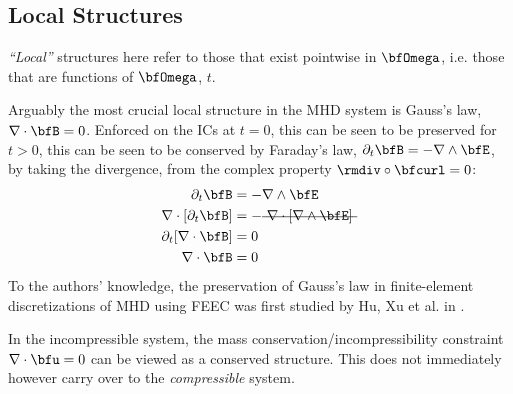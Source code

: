 \subsection*{Local Structures}
    \emph{``Local''} structures here refer to those that exist pointwise in $\bfOmega$, i.e. those that are functions of $\bfOmega$, $t$.
    
    Arguably the most crucial local structure in the MHD system is Gauss's law, $\nabla\cdot\bfB  =  0$. Enforced on the ICs at $t  =  0$, this can be seen to be preserved for $t  >  0$, this can be seen to be conserved by Faraday's law, $\partial_{t}\bfB  =  - \nabla\wedge\bfE$, by taking the divergence, from the complex property $\rmdiv\circ\bfcurl  =  0$: \cite{Stratton_1941, Rosen_1980, Freistühler_Warnecke_2002}
    \begin{align}
                    \partial_{t}\bfB   &=  - \nabla\wedge\bfE  \\
        \nabla\cdot[\partial_{t}\bfB]  &=  - \mst{\nabla\cdot[\nabla\wedge\bfE]}  \\
        \partial_{t}[\nabla\cdot\bfB]  &=  0  \\
                     \nabla\cdot\bfB   &=  0
    \end{align}
    To the authors' knowledge, the preservation of Gauss's law in finite-element discretizations of MHD using FEEC was first studied by Hu, Xu et al. in \cite{Hu_Xu_2015, Hu_Ma_Xu_2017}.

    \begin{remark}
        In the incompressible system, the mass conservation/incompressibility constraint $\nabla\cdot\bfu  =  0$ can be viewed as a conserved structure. This does not immediately however carry over to the \emph{compressible} system.
    \end{remark}
